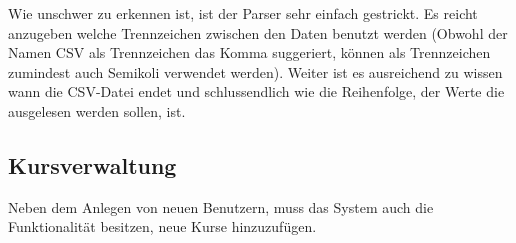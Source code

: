 Wie unschwer zu erkennen ist, ist der Parser sehr einfach gestrickt. Es reicht anzugeben welche Trennzeichen zwischen den Daten benutzt werden (Obwohl der Namen CSV als Trennzeichen das Komma suggeriert, können als Trennzeichen zumindest auch Semikoli verwendet werden).
Weiter ist es ausreichend zu wissen wann die CSV-Datei endet und schlussendlich wie die Reihenfolge, der Werte die ausgelesen werden sollen, ist.

	

\subsection{Kursverwaltung}

Neben dem Anlegen von neuen Benutzern, muss das System auch die Funktionalität besitzen, neue Kurse hinzuzufügen.

